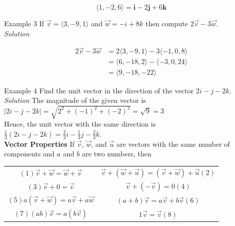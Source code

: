         \begin{equation*}
            \langle 1,-2,6 \rangle= \textbf{i} - 2\textbf{j} + 6\textbf{k}
        \end{equation*}

        \noindent \color{blue} Example 3 \color{black} If $\overrightarrow{v}=\langle3,-9,1\rangle$
        and $\overrightarrow{w}=-i+8k$ then compute $2\overrightarrow{v}-3\overrightarrow{w}.$\\

        \emph{Solution}

        \begin{align*}
            2\overrightarrow{v}-3\overrightarrow{w} &= 2\langle3,-9,1\rangle-3\langle-1,0,8\rangle\\
            &= \langle6,-18,2\rangle-\langle-3,0,24\rangle\\
            &= \langle9,-18,-22\rangle
        \end{align*}

        \noindent \color{blue} Example 4 \color{black} Find the unit vector in the direction of
        the vector $2i-j-2k$.\\

        \noindent \emph{Solution} The magnitude of the given vector is\\
        $|2i-j-2k|=\sqrt{2^2+(-1)^2+(-2)^2}=\sqrt{9}=3$\\
        Hence, the unit vector with the same direction is\\
        $\frac{1}{3}(2i-j-2k)=\frac{2}{3}i-\frac{1}{3}j-\frac{2}{3}k$.\\

        \noindent \color{purple} \textbf{Vector Properties} \color{black} If
        $\overrightarrow{v}$, $\overrightarrow{w}$, and $\overrightarrow{u}$ are vectors with the
        same number of components and $a$ and $b$ are two numbers, then

        \begin{center}
            \begin{tabular}{c|c}
                $(1)\overrightarrow{v}+\overrightarrow{w}=\overrightarrow{w}+\overrightarrow{v}$
                & $\overrightarrow{v}+(\overrightarrow{w}+\overrightarrow{u})=(\overrightarrow{v}
                +\overrightarrow{w})+\overrightarrow{u}(2)$ \\
                $(3)\overrightarrow{v}+0=\overrightarrow{v}$
                & $\overrightarrow{v}+(-\overrightarrow{v})=0(4)$\\
                $(5)a(\overrightarrow{v}+\overrightarrow{w})=a\overrightarrow{v}+a\overrightarrow{w}$
                & $(a+b)\overrightarrow{v}=a\overrightarrow{v}+b\overrightarrow{v}(6)$\\
                $(7)(ab)\overrightarrow{v}=a(b\overrightarrow{v})$
                & $1\overrightarrow{v} = \overrightarrow{v}(8)$
            \end{tabular}
        \end{center}



